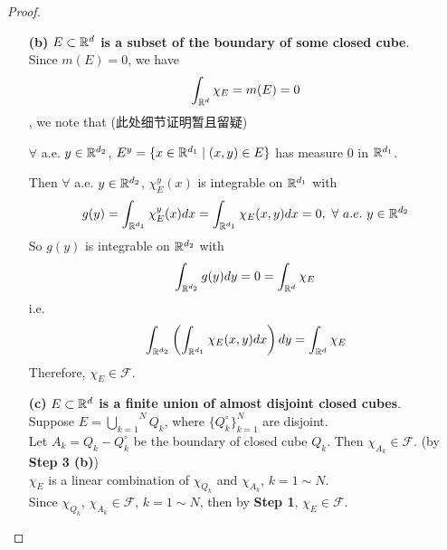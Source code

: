 \begin{proof}
\begin{itemize}
\begin{enumerate}
				\item[\textbf{(b)}]\textbf{$E \subset \mathbb{R}^d$ is a subset of the boundary of some closed cube}. \\
				Since $m(E) = 0$, we have
				\begin{align}
					\int_{\mathbb{R}^d}{\chi_E} = m(E) = 0
				\end{align}
				, we note that (此处细节证明暂且留疑)
				\begin{center}
					$\forall$ a.e. $y \in \mathbb{R}^{d_2}$, $E^y = \{ x \in \mathbb{R}^{d_1} \mid (x , y) \in E \}$ has measure 0 in $\mathbb{R}^{d_1}$.
				\end{center}
				Then $\forall$ a.e. $y \in \mathbb{R}^{d_2}$, $\chi_{E}^{y}(x)$ is integrable on $\mathbb{R}^{d_1}$ with
				\begin{align}
					g(y) = \int_{\mathbb{R}^{d_1}}{\chi_{E}^{y}(x) dx} = \int_{\mathbb{R}^{d_1}}{\chi_{E}(x , y) dx} = 0 , \,\, \forall \,\, a.e. \,\, y \in \mathbb{R}^{d_2}
				\end{align}
				So $g(y)$ is integrable on $\mathbb{R}^{d_2}$ with
				\begin{align}
					\int_{\mathbb{R}^{d_2}}{g(y) dy} = 0 = \int_{\mathbb{R}^d}{\chi_E}
				\end{align}
				i.e.
				\begin{align}
					\int_{\mathbb{R}^{d_2}}{\left( \int_{\mathbb{R}^{d_1}}{\chi_{E}(x , y) dx} \right) dy} = \int_{\mathbb{R}^d}{\chi_E}
				\end{align}
				Therefore, $\chi_E \in \mathcal{F}$.
				
				\newpage
				
				\item[\textbf{(c)}]\textbf{$E \subset \mathbb{R}^d$ is a finite union of almost disjoint closed cubes}. \\
				Suppose $E = \overset{N}{\underset{k = 1}{\bigcup}}{Q_k}$, where $\{ Q_{k}^{\circ} \}_{k = 1}^{N}$ are disjoint. \\
				Let $A_k = Q_k - Q_{k}^{\circ}$ be the boundary of closed cube $Q_k$. Then $\chi_{A_k} \in \mathcal{F}$. (by \textbf{Step 3 (b)})\\
				$\chi_E$ is a linear combination of $\chi_{Q_k}$ and $\chi_{A_k}$, $k = 1 \sim N$. \\
				Since $\chi_{Q_k}$, $\chi_{A_k} \in \mathcal{F}$, $k = 1 \sim N$, then by \textbf{Step 1}, $\chi_E \in \mathcal{F}$.
				
				\vspace{6em}
				

\end{enumerate}
\end{itemize}
\end{proof}
